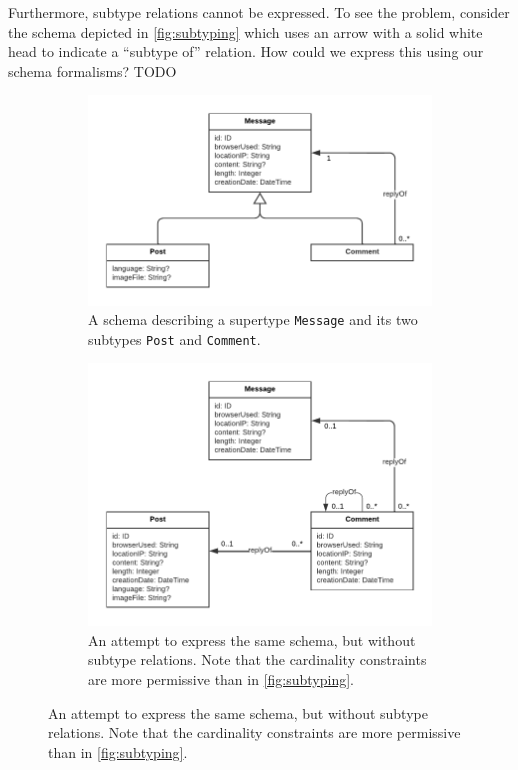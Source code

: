\documentclass[a4paper]{article}
\begin{document}

Furthermore, subtype relations cannot be expressed. To see the problem, consider the schema depicted in \autoref{fig:subtyping} which uses an arrow with a solid white head to indicate a ``subtype of'' relation. How could we express this using our schema formalisms? TODO

\begin{figure}[t]
  \centering
  \begin{subfigure}[t]{0.45\textwidth}
    \centering
    \includegraphics[width=\textwidth]{figures/subtyping}
    \caption{A schema describing a supertype \texttt{Message} and its two subtypes \texttt{Post} and \texttt{Comment}.}
    \label{fig:subtyping}
  \end{subfigure}
  \hfill
  \begin{subfigure}[t]{0.45\textwidth}
    \centering
    \includegraphics[width=\textwidth]{figures/subtyping-ours}
    \caption{An attempt to express the same schema, but without subtype relations. Note that the cardinality constraints are more permissive than in \autoref{fig:subtyping}.}
    \label{fig:subtyping-ours}
  \end{subfigure}
\end{figure}
\end{document}
